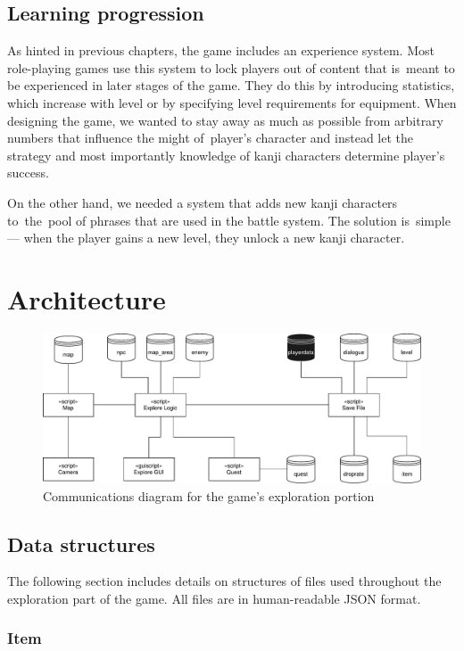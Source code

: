 \documentclass[thesis=B,english,hidelinks]{FITthesisXE}[2012/06/26]
\begin{document}
\subsection{Learning progression}

As hinted in previous chapters, the game includes an experience system. Most role-playing games use this system to lock players out of content that is~meant to be experienced in later stages of the game. They do this by introducing statistics, which increase with level or by specifying level requirements for equipment. When designing the game, we wanted to stay away as much as possible from arbitrary numbers that influence the might of~player's character and instead let the strategy and most importantly knowledge of kanji characters determine player's success.

On the other hand, we needed a system that adds new kanji characters to~the~pool of phrases that are used in the battle system. The solution is~simple --- when the player gains a new level, they unlock a new kanji character.

\section{Architecture}

\begin{figure}[ht]
\centering
\includegraphics[scale=0.57]{diagram_explore}
\caption{Communications diagram for the game's exploration portion}
\label{fig:diagram_explore}
\end{figure}

\subsection{Data structures}

The following section includes details on structures of files used throughout the exploration part of the game. All files are in human-readable JSON format.

\subsubsection{Item}
\end{document}
